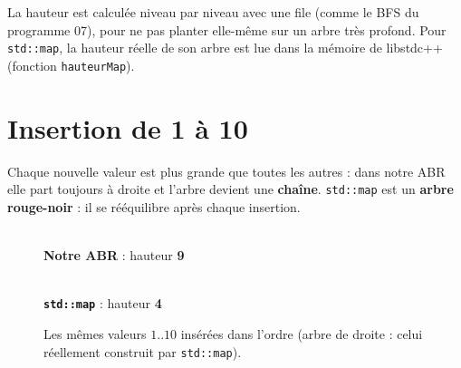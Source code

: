 \documentclass[11pt,a4paper]{article}
\begin{document}
La hauteur est calculée niveau par niveau avec une file (comme le BFS du programme 07),
pour ne pas planter elle-même sur un arbre très profond. Pour \texttt{std::map}, la hauteur
réelle de son arbre est lue dans la mémoire de libstdc++ (fonction \texttt{hauteurMap}).

\section{Insertion de 1 à 10}

Chaque nouvelle valeur est plus grande que toutes les autres : dans notre ABR elle part
toujours à droite et l'arbre devient une \textbf{chaîne}. \texttt{std::map} est un
\textbf{arbre rouge-noir} : il se rééquilibre après chaque insertion.

\begin{figure}[H]
\centering
\begin{minipage}[b]{0.40\textwidth}\centering
{}\\[4pt]
\small\textbf{Notre ABR} : hauteur \textbf{9}
\end{minipage}
\hfill
\begin{minipage}[b]{0.55\textwidth}\centering
{}\\[4pt]
\small\textbf{\texttt{std::map}} : hauteur \textbf{4}
\end{minipage}
\caption{Les mêmes valeurs $1..10$ insérées dans l'ordre (arbre de droite : celui réellement
construit par \texttt{std::map}).}
\end{figure}
\end{document}
